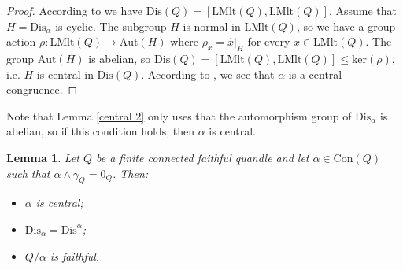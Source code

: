\documentclass[a4paper, english, 9pt]{amsart}
\theoremstyle{plain}
\newtheorem{corollary}[theorem]{Corollary}
\newtheorem{lemma}[theorem]{Lemma}
\theoremstyle{definition}
\def\ker#1{\mathrm{ker}(#1)}
\def\aut#1{\mathrm{Aut}(#1)}
\def\lmlt{\mathrm{LMlt}}
\def\dis{\mathrm{Dis}}
\def\con{\mathrm{Con}}
\def\comment#1{{\color{red} #1}}
\def\Ma{\mathcal Max}
\def\ma{\mathcal Min}
\begin{document}
\begin{proof}
According to \cite[Proposition 2.3]{hsv} we have $\dis(Q)=[\lmlt(Q),\lmlt(Q)]$. Assume that $H=\dis_\alpha$ is cyclic. The subgroup $H$ is normal in $\lmlt(Q)$, so we have a group action $\rho:\lmlt(Q)\longrightarrow \aut{H}$ where $\rho_x=\widehat{x}|_H$ for every $x\in \lmlt(Q)$. The group $\aut{H}$ is abelian, so $\dis(Q)=[\lmlt(Q),\lmlt(Q)]\leq \ker{\rho}$, i.e. $H$ is central in $\dis(Q)$. According to \cite[Corollary 5.4]{CP}, we see that $\alpha$ is a central congruence.
\end{proof}
Note that Lemma \ref{central 2} only uses that the automorphism group of $\dis_\alpha$ is abelian, so if this condition holds, then $\alpha$ is central.
%


%
%


\begin{lemma}\label{central}
Let $Q$ be a finite connected faithful quandle and let $\alpha\in \con(Q)$ such that $\alpha\wedge \gamma_Q=0_Q$. Then: 
\begin{itemize}
\item[(i)] $\alpha$ is central; 
\item[(ii)] $\dis_\alpha=\dis^\alpha$; 
\item[(iii)] $Q/\alpha$ is faithful.
\end{itemize}

\end{lemma}
\end{document}
